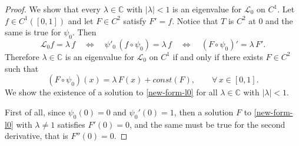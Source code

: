 \documentclass[11pt]{amsart}
\theoremstyle{definition}
\theoremstyle{remark}
\theoremstyle{definition}
\numberwithin{equation}{section}
\newcommand{\C}{\mathbb C}
\newcommand{\LL}{\mathcal{L}}
\begin{document}
\begin{proof}
We show that every $\lambda \in \C$ with $|\lambda|<1$ is an eigenvalue for $\LL_0$ on $C^1$. Let $f\in C^1([0,1])$ and let $F\in C^{2}$ satisfy $F'=f$. Notice that $T$ is $C^2$ at 0 and the same is true for $\psi_0$. Then
\[
\LL_0 f = \lambda \, f \quad \Leftrightarrow \quad \psi'_0 \, (f\circ \psi_0) = \lambda \, f \quad \Leftrightarrow \quad (F\circ \psi_0)' = \lambda\, F'.
\]
Therefore $\lambda \in \C$ is an eigenvalue for $\LL_0$ on $C^1$ if and only if there exists $F\in C^2$ such that
\begin{equation} \label{new-form-l0}
(F\circ \psi_0)(x) = \lambda\, F(x) + const(F),\qquad \forall\, x\in [0,1].
\end{equation}
We show the existence of a solution to \eqref{new-form-l0} for all $\lambda \in \C$ with $|\lambda|<1$.

First of all, since $\psi_0(0)=0$ and $\psi_0'(0)=1$, then a solution $F$ to \eqref{new-form-l0} with $\lambda\not=1$ satisfies $F'(0)=0$, and the same must be true for the second derivative, that is $F''(0)=0$. 


\end{proof}
\end{document}
